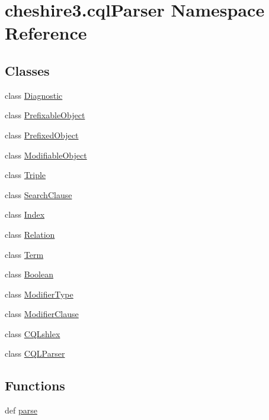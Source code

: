 \hypertarget{namespacecheshire3_1_1cql_parser}{\section{cheshire3.\-cql\-Parser Namespace Reference}
\label{namespacecheshire3_1_1cql_parser}
}
\subsection*{Classes}
\begin{DoxyCompactItemize}
\item 
class \hyperlink{classcheshire3_1_1cql_parser_1_1_diagnostic}{Diagnostic}
\item 
class \hyperlink{classcheshire3_1_1cql_parser_1_1_prefixable_object}{Prefixable\-Object}
\item 
class \hyperlink{classcheshire3_1_1cql_parser_1_1_prefixed_object}{Prefixed\-Object}
\item 
class \hyperlink{classcheshire3_1_1cql_parser_1_1_modifiable_object}{Modifiable\-Object}
\item 
class \hyperlink{classcheshire3_1_1cql_parser_1_1_triple}{Triple}
\item 
class \hyperlink{classcheshire3_1_1cql_parser_1_1_search_clause}{Search\-Clause}
\item 
class \hyperlink{classcheshire3_1_1cql_parser_1_1_index}{Index}
\item 
class \hyperlink{classcheshire3_1_1cql_parser_1_1_relation}{Relation}
\item 
class \hyperlink{classcheshire3_1_1cql_parser_1_1_term}{Term}
\item 
class \hyperlink{classcheshire3_1_1cql_parser_1_1_boolean}{Boolean}
\item 
class \hyperlink{classcheshire3_1_1cql_parser_1_1_modifier_type}{Modifier\-Type}
\item 
class \hyperlink{classcheshire3_1_1cql_parser_1_1_modifier_clause}{Modifier\-Clause}
\item 
class \hyperlink{classcheshire3_1_1cql_parser_1_1_c_q_lshlex}{C\-Q\-Lshlex}
\item 
class \hyperlink{classcheshire3_1_1cql_parser_1_1_c_q_l_parser}{C\-Q\-L\-Parser}
\end{DoxyCompactItemize}
\subsection*{Functions}
\begin{DoxyCompactItemize}
\item 
def \hyperlink{namespacecheshire3_1_1cql_parser_a951b7eb5588d3def784d7d8bc213a09e}{parse}
\end{DoxyCompactItemize}
